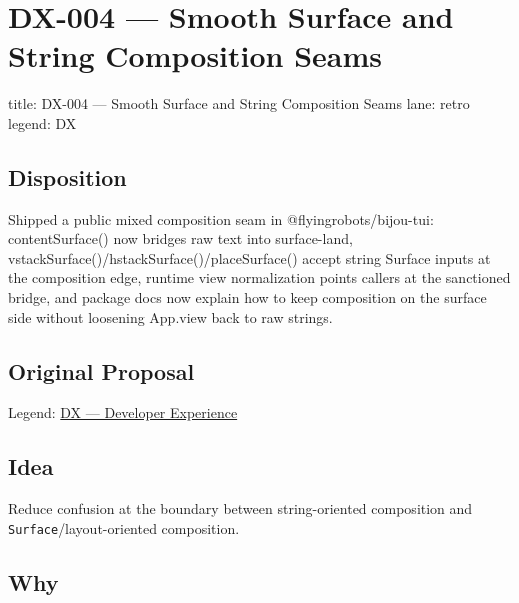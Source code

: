 \chapter{DX-004 --- Smooth Surface and String Composition Seams}\label{record-336}

\smallskip

\begin{RecordMeta}
title: DX-004 — Smooth Surface and String Composition Seams
lane: retro
legend: DX

\end{RecordMeta}

\section{Disposition}\label{record-336-disposition}

Shipped a public mixed composition seam in @flyingrobots/bijou-tui: contentSurface() now bridges raw text into surface-land, vstackSurface()/hstackSurface()/placeSurface() accept string \textbar{} Surface inputs at the composition edge, runtime view normalization points callers at the sanctioned bridge, and package docs now explain how to keep composition on the surface side without loosening App.view back to raw strings.

\section{Original Proposal}\label{record-336-original-proposal}

Legend: \href{https://github.com/flyingrobots/bijou/blob/1853ad902f6bf219326409e7f743a5a1d6517dbc/docs/method/legends/DX-developer-experience.md}{DX --- Developer Experience}

\section{Idea}\label{record-336-idea}

Reduce confusion at the boundary between string-oriented composition and \texttt{S\allowbreak{}u\allowbreak{}r\allowbreak{}f\allowbreak{}a\allowbreak{}c\allowbreak{}e}/layout-oriented composition.

\section{Why}\label{record-336-why}

